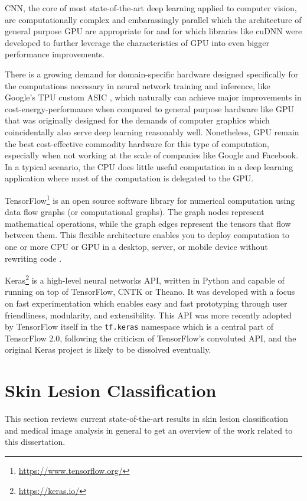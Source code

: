 \ac{CNN}, the core of most state-of-the-art deep learning applied to computer vision, are computationally complex and embarassingly parallel \cite{chang2017} which the architecture of general purpose \ac{GPU} are appropriate for \cite{gpu} and for which libraries like cuDNN \cite{cudnn} were developed to further leverage the characteristics of \ac{GPU} into even bigger performance improvements.

There is a growing demand for domain-specific hardware designed specifically for the computations necessary in neural network training and inference, like Google's TPU custom ASIC \cite{tpu}, which naturally can achieve major improvements in cost-energy-performance when compared to general purpose hardware like \ac{GPU} that was originally designed for the demands of computer graphics which coincidentally also serve deep learning reasonably well. Nonetheless, \ac{GPU} remain the best cost-effective commodity hardware for this type of computation, especially when not working at the scale of companies like Google and Facebook. In a typical scenario, the CPU does little useful computation in a deep learning application where most of the computation is delegated to the GPU.

TensorFlow\footnote{\url{https://www.tensorflow.org/}} is an open source software library for numerical computation using data flow graphs (or computational graphs). The graph nodes represent mathematical operations, while the graph edges represent the tensors that flow between them. This flexible architecture enables you to deploy computation to one or more CPU or GPU in a desktop, server, or mobile device without rewriting code \cite{tensorflow}.

Keras\footnote{\url{https://keras.io/}} is a high-level neural networks API, written in Python and capable of running on top of TensorFlow, CNTK or Theano. It was developed with a focus on fast experimentation which enables easy and fast prototyping through user friendliness, modularity, and extensibility. This API was more recently adopted by TensorFlow itself in the \verb|tf.keras| namespace which is a central part of TensorFlow 2.0, following the criticism of TensorFlow's convoluted API, and the original Keras project is likely to be dissolved eventually.

\section{Skin Lesion Classification}

This section reviews current state-of-the-art results in skin lesion classification and medical image analysis in general to get an overview of the work related to this dissertation.

